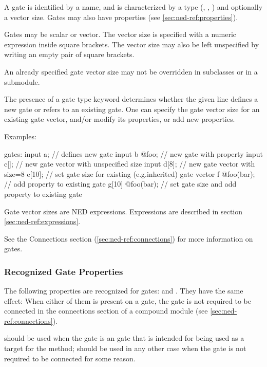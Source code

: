 A gate is identified by a name, and is characterized by a type
(, , ) and optionally a
vector size. Gates may also have properties (see
\ref{sec:ned-ref:properties}).

Gates may be scalar or vector. The vector size is specified with a numeric
expression inside square brackets. The vector size may also be left
unspecified by writing an empty pair of square brackets.

An already specified gate vector size may not be overridden in subclasses or
in a submodule.

The presence of a gate type keyword determines whether the given line defines
a new gate or refers to an existing gate. One can specify the gate vector
size for an existing gate vector, and/or modify its properties, or add new
properties.

Examples:

\begin{ned}
gates:
  input a;         // defines new gate
  input b @foo;    // new gate with property
  input c[];       // new gate vector with unspecified size
  input d[8];      // new gate vector with size=8
  e[10];           // set gate size for existing (e.g.inherited) gate vector
  f @foo(bar);     // add property to existing gate
  g[10] @foo(bar); // set gate size and add property to existing gate
\end{ned}

Gate vector sizes are NED expressions. Expressions are described in section
\ref{sec:ned-ref:expressions}.

See the Connections section (\ref{sec:ned-ref:connections}) for more
information on gates.

\subsubsection{Recognized Gate Properties}
\label{sec:ned-ref:recognized-gate-properties}

The following properties are recognized for gates: 
and . They have the same effect: When either of them is
present on a gate, the gate is not required to be connected in the
connections section of a compound module (see \ref{sec:ned-ref:connections}).

 should be used when the gate is an  gate that is
intended for being used as a target for the  method;
 should be used in any other case when the gate is not
required to be connected for some reason.

